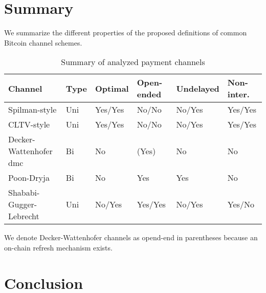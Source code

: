 \documentclass{llncs}
\begin{document}
\section{Summary}

We summarize the different properties of the proposed definitions of common Bitcoin channel schemes.

\begin{table}[ht]
  \begin{tabularx}{\textwidth}{ | X | l | l | l | l | l |}
  \hline
  Channel & Type & Optimal & Open-ended & Undelayed & Non-inter. \\
  \hline \hline
  Spilman-style & Uni & Yes/Yes & No/No & No/Yes & Yes/Yes \\ \hline
  CLTV-style & Uni & Yes/Yes & No/No & No/Yes & Yes/Yes \\ \hline
  Decker-Wattenhofer \gls{dmc} & Bi & No & (Yes) & No & No \\ \hline
  Poon-Dryja & Bi & No & Yes & Yes & No \\ \hline
  Shababi-Gugger-Lebrecht & Uni & No/Yes & Yes/Yes & No/Yes & Yes/No \\
  \hline
  \end{tabularx}
  \caption{Summary of analyzed payment channels}
  \label{fig:summaryPaymentChannel}
\end{table}

We denote Decker-Wattenhofer channels as opend-end in parentheses because an on-chain refresh mechanism exists.

\section{Conclusion}



%
%

%
%
\printbibliography
\end{document}
